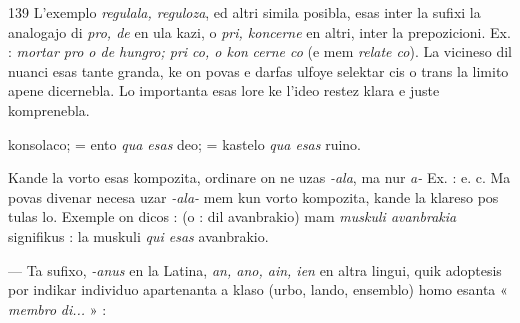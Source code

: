 \begin{VUpage}[143]{139}
{L'exemplo \textit{regulala, reguloza}, ed altri simila posibla, esas inter la\nl
sufixi la analogajo di \textit{pro, de} en ula kazi, o \textit{pri, koncerne} en altri,\nl
inter la prepozicioni. Ex. : \textit{mortar pro o de hungro; pri co, o kon}\cc
\textit{cerne co} (e mem \textit{relate co}). La vicineso dil nuanci esas tante granda,\nl
ke on povas e darfas ulfoye selektar cis o trans la limito apene\nl
dicernebla. Lo importanta esas lore ke l'ideo restez klara e juste\nl
komprenebla.%
}

\VUcontinue
konsolaco;  = ento \textit{qua esas} deo;  =\nl
kastelo \textit{qua esas} ruino.

Kande la vorto esas kompozita, ordinare on ne uzas \textit{-ala},\nl
ma nur \textit{a-} Ex. : \cc
{}\nl
{} e. c. Ma povas divenar necesa\nl
uzar \textit{-ala-} mem kun vorto kompozita, kande la klareso pos\cc
tulas lo. Exemple on dicos :  (o :\nl
dil avanbrakio) mam \textit{muskuli avanbrakia} signifikus : la\nl
muskuli \textit{qui esas} avanbrakio.

 --- Ta sufixo, \textit{-anus} en la Latina, \textit{an, ano, ain, ien} en\nl
altra lingui, quik adoptesis por indikar individuo apartenanta\nl
a klaso (urbo, lando, ensemblo) homo esanta « \textit{membro}\nl
\textit{di...} » : \parplein
\end{VUpage}

